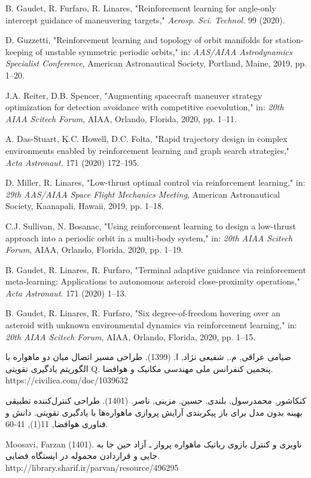 \documentclass[a4paper]{article}
\newcommand{\Courses}[1]{
{
    \noindent
    \textbf{دروس مورد نیاز:}\\
    
    \centering
    \renewcommand{\arraystretch}{1.5}
    \begin{center}
    \begin{tabular}{| >{\centering}m{6em} | >{\centering}m{3em} | >{\centering}m{6em} | >{\centering}m{6em} | >{\centering}m{3em} | >{\centering\arraybackslash}m{6em} |}
         \hline
         \rowcolor{lightgray}
         \multicolumn{3}{|c|}{جبرانی}
         &
         \multicolumn{3}{|c|}{تخصصی
            \tiny
            (ارتباط موضوع پروژه با دروسی که دانشجو گذرانده یا باید بگذراند)
         }
         \\
         \hline
         \rowcolor{lightgray}
         گذرانده
         &
         نمره
         &
         باید بگذراند
         &
         گذرانده
         &
         نمره
         &
         باید بگذراند
         \\
         \hline
         &
         &
         &
         &
         &
         \\
         \hline
         &
         &
         &
         &
         &
         \\
         \hline
         &
         &
         &
         &
         &
         \\
         \hline
    \end{tabular}
    \end{center}
    \renewcommand{\arraystretch}{1}
}
}
\newcommand{\Signatures}{
{
    \renewcommand{\arraystretch}{1.5}
    
    \begin{center}
        \scriptsize
        \begin{tabular}{|m{15em}|m{15em}|m{15em}|}
            \hline
            استاد راهنما:
            &
            نظر گروه:
            &
            نظر کمیته تحصیلات تکمیلی دانشکده:
            \\
            تاریخ تحویل فرم به مدیر گروه:
            &
            &
            \\
            امضای استاد راهنما:
            &
            تاریخ جلسه گروه:
            &
            تاریخ جلسه کمیته:
            \\ 
            &
            امضای مدیر گروه:
            &
            امضای معاون تحصیلات تکمیلی:
            \\
            &
            &
            \\
            &
            &
            \\
            & &\\
            & &\\
            \hline
        \end{tabular}
    \end{center}
    \footnotesize
    توجه: فرم تعریف پروژه بایستی یک روز قبل از جلسه گروه توسط استاد راهنما تحویل مدیر گروه شود.
    \renewcommand{\arraystretch}{1}
}
}
\begin{document}
\begin{thebibliography}{1}
		B. Gaudet, R. Furfaro, R. Linares,
		"Reinforcement learning for angle-only intercept guidance of maneuvering targets,"
		\textit{Aerosp. Sci. Technol.} 99 (2020).
		
		D. Guzzetti,
		"Reinforcement learning and topology of orbit manifolds for station-keeping of unstable symmetric periodic orbits,"
		in: \textit{AAS/AIAA Astrodynamics Specialist Conference}, American Astronautical Society, Portland, Maine, 2019, pp. 1–20.
		
		J.A. Reiter, D.B. Spencer,
		"Augmenting spacecraft maneuver strategy optimization for detection avoidance with competitive coevolution,"
		in: \textit{20th AIAA Scitech Forum}, AIAA, Orlando, Florida, 2020, pp. 1–11.
		
		A. Das-Stuart, K.C. Howell, D.C. Folta,
		"Rapid trajectory design in complex environments enabled by reinforcement learning and graph search strategies,"
		\textit{Acta Astronaut.} 171 (2020) 172–195.
		
		D. Miller, R. Linares,
		"Low-thrust optimal control via reinforcement learning,"
		in: \textit{29th AAS/AIAA Space Flight Mechanics Meeting}, American Astronautical Society, Kaanapali, Hawaii, 2019, pp. 1–18.
		
		C.J. Sullivan, N. Bosanac,
		"Using reinforcement learning to design a low-thrust approach into a periodic orbit in a multi-body system,"
		in: \textit{20th AIAA Scitech Forum}, AIAA, Orlando, Florida, 2020, pp. 1–19.
		
		
		B. Gaudet, R. Linares, R. Furfaro,
		"Terminal adaptive guidance via reinforcement meta-learning: Applications to autonomous asteroid close-proximity operations,"
		\textit{Acta Astronaut.} 171 (2020) 1–13.
		
		
		B. Gaudet, R. Linares, R. Furfaro,
		"Six degree-of-freedom hovering over an asteroid with unknown environmental dynamics via reinforcement learning,"
		in: \textit{20th AIAA Scitech Forum}, AIAA, Orlando, Florida, 2020, pp. 1–15.
		
		صیامی عراقی, م.,  شفیعی نژاد, ا. (1399). طراحی مسیر اتصال میان دو ماهواره با الگوریتم یادگیری تقویتی Q. پنجمین کنفرانس ملی مهندسی مکانیک و هوافضا. https://civilica.com/doc/1039632
		
کنکاشور, محمدرسول, بلندی, حسین,  مزینی, ناصر. (1401). طراحی کنترل‌کننده تطبیقی بهینه بدون مدل برای باز پیکربندی آرایش پروازی ماهواره‌ها با یادگیری تقویتی. دانش و فناوری هوافضا, 11(1), 41-60.
		
		Moosavi, Farzan (1401). ناوبری و کنترل بازوی رباتیک ماهواره پرواز ـ آزاد حین جا به‌ جایی و قراردادن محموله در ایستگاه‌ فضایی. http://library.sharif.ir/parvan/resource/496295
		
	\end{thebibliography}



\end{document}
